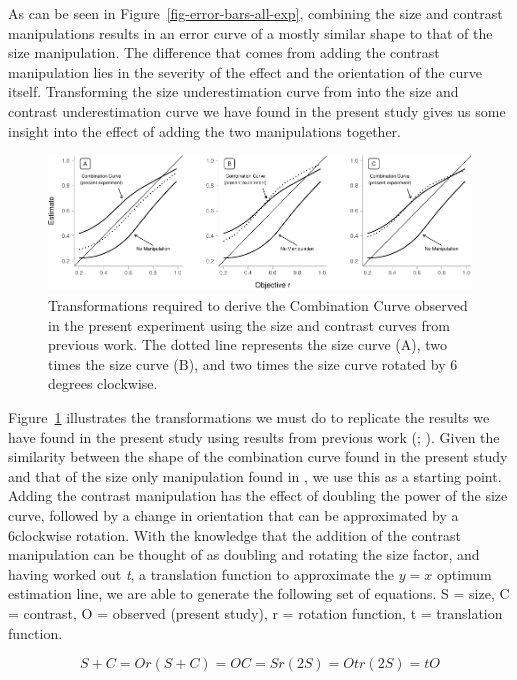 \documentclass[manuscript, review, anonymous, screen]{acmart}
\begin{document}
As can be seen in Figure~\ref{fig-error-bars-all-exp}, combining the
size and contrast manipulations results in an error curve of a mostly
similar shape to that of the size manipulation. The difference that
comes from adding the contrast manipulation lies in the severity of the
effect and the orientation of the curve itself. Transforming the size
underestimation curve from \citet{strain_2023} into the size and
contrast underestimation curve we have found in the present study gives
us some insight into the effect of adding the two manipulations
together.

\begin{figure}

{\centering \includegraphics[width=1\textwidth,height=\textheight]{size_and_contrast_new_files/figure-pdf/fig-transformation-1.pdf}

}

\caption{\label{fig-transformation}Transformations required to derive
the Combination Curve observed in the present experiment using the size
and contrast curves from previous work. The dotted line represents the
size curve (A), two times the size curve (B), and two times the size
curve rotated by 6 degrees clockwise.}

\end{figure}

Figure~\ref{fig-transformation} illustrates the transformations we must
do to replicate the results we have found in the present study using
results from previous work (\citet{strain_2023}; \citet{strain_2023b}).
Given the similarity between the shape of the combination curve found in
the present study and that of the size only manipulation found in
\citet{strain_2023b}, we use this as a starting point. Adding the
contrast manipulation has the effect of doubling the power of the size
curve, followed by a change in orientation that can be approximated by a
6\textdegree clockwise rotation. With the knowledge that the addition of
the contrast manipulation can be thought of as doubling and rotating the
size factor, and having worked out \emph{t}, a translation function to
approximate the \(y = x\) optimum estimation line, we are able to
generate the following set of equations. S = size, C = contrast, O =
observed (present study), r = rotation function, t = translation
function.

\begin{equation}
  S + C = O
  r(S + C) = O
  C = S
  r(2S) = O
  tr(2S) = tO
\end{equation}




\end{document}
